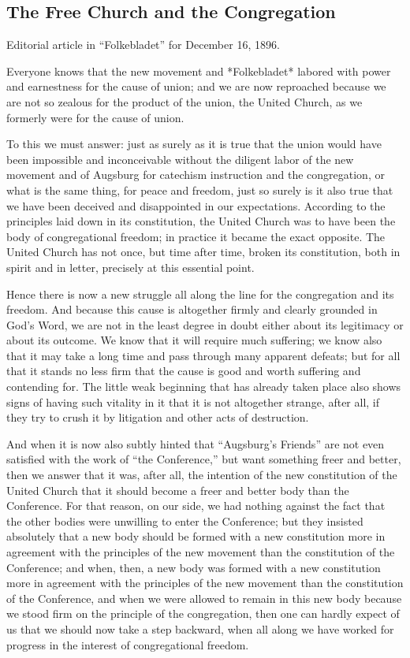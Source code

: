 
\subsection{The Free Church and the Congregation}

Editorial article in “Folkebladet” for December 16, 1896.

Everyone knows that the new movement and *Folkebladet* labored with power and earnestness for the cause of union; and we are now reproached because we are not so zealous for the product of the union, the United Church, as we formerly were for the cause of union.

To this we must answer: just as surely as it is true that the union would have been impossible and inconceivable without the diligent labor of the new movement and of Augsburg for catechism instruction and the congregation, or what is the same thing, for peace and freedom, just so surely is it also true that we have been deceived and disappointed in our expectations. According to the principles laid down in its constitution, the United Church was to have been the body of congregational freedom; in practice it became the exact opposite. The United Church has not once, but time after time, broken its constitution, both in spirit and in letter, precisely at this essential point.

Hence there is now a new struggle all along the line for the congregation and its freedom. And because this cause is altogether firmly and clearly grounded in God’s Word, we are not in the least degree in doubt either about its legitimacy or about its outcome. We know that it will require much suffering; we know also that it may take a long time and pass through many apparent defeats; but for all that it stands no less firm that the cause is good and worth suffering and contending for. The little weak beginning that has already taken place also shows signs of having such vitality in it that it is not altogether strange, after all, if they try to crush it by litigation and other acts of destruction.

And when it is now also subtly hinted that “Augsburg’s Friends” are not even satisfied with the work of “the Conference,” but want something freer and better, then we answer that it was, after all, the intention of the new constitution of the United Church that it should become a freer and better body than the Conference. For that reason, on our side, we had nothing against the fact that the other bodies were unwilling to enter the Conference; but they insisted absolutely that a new body should be formed with a new constitution more in agreement with the principles of the new movement than the constitution of the Conference; and when, then, a new body was formed with a new constitution more in agreement with the principles of the new movement than the constitution of the Conference, and when we were allowed to remain in this new body because we stood firm on the principle of the congregation, then one can hardly expect of us that we should now take a step backward, when all along we have worked for progress in the interest of congregational freedom.

